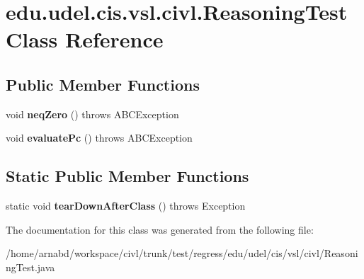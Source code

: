 \hypertarget{classedu_1_1udel_1_1cis_1_1vsl_1_1civl_1_1ReasoningTest}{}\section{edu.\+udel.\+cis.\+vsl.\+civl.\+Reasoning\+Test Class Reference}
\label{classedu_1_1udel_1_1cis_1_1vsl_1_1civl_1_1ReasoningTest}
\subsection*{Public Member Functions}
\begin{DoxyCompactItemize}
\item 
\hypertarget{classedu_1_1udel_1_1cis_1_1vsl_1_1civl_1_1ReasoningTest_a540d1b3adb39e8037aec7d2e94f8a54b}{}void {\bfseries neq\+Zero} ()  throws A\+B\+C\+Exception \label{classedu_1_1udel_1_1cis_1_1vsl_1_1civl_1_1ReasoningTest_a540d1b3adb39e8037aec7d2e94f8a54b}

\item 
\hypertarget{classedu_1_1udel_1_1cis_1_1vsl_1_1civl_1_1ReasoningTest_a6418956dfeb4b4264ba3c57d48202c44}{}void {\bfseries evaluate\+Pc} ()  throws A\+B\+C\+Exception \label{classedu_1_1udel_1_1cis_1_1vsl_1_1civl_1_1ReasoningTest_a6418956dfeb4b4264ba3c57d48202c44}

\end{DoxyCompactItemize}
\subsection*{Static Public Member Functions}
\begin{DoxyCompactItemize}
\item 
\hypertarget{classedu_1_1udel_1_1cis_1_1vsl_1_1civl_1_1ReasoningTest_ac5648aa991fe95aea9c3bc80748e657a}{}static void {\bfseries tear\+Down\+After\+Class} ()  throws Exception \label{classedu_1_1udel_1_1cis_1_1vsl_1_1civl_1_1ReasoningTest_ac5648aa991fe95aea9c3bc80748e657a}

\end{DoxyCompactItemize}


The documentation for this class was generated from the following file\+:\begin{DoxyCompactItemize}
\item 
/home/arnabd/workspace/civl/trunk/test/regress/edu/udel/cis/vsl/civl/Reasoning\+Test.\+java\end{DoxyCompactItemize}
